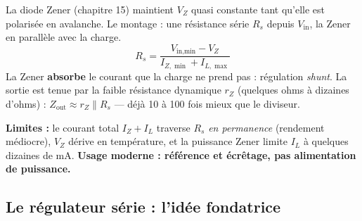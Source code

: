 \documentclass[12pt,a4paper,twoside]{book}
\begin{document}
\begin{formule}
La diode Zener (chapitre 15) maintient $V_Z$ quasi constante tant qu'elle est polarisée en avalanche. Le montage : une résistance série $R_s$ depuis $V_{\text{in}}$, la Zener en parallèle avec la charge.
\[
R_s = \frac{V_{\text{in,min}} - V_Z}{I_{Z,\min} + I_{L,\max}}
\]
La Zener \textbf{absorbe} le courant que la charge ne prend pas : régulation \textit{shunt}. La sortie est tenue par la faible résistance dynamique $r_Z$ (quelques ohms à dizaines d'ohms) : $Z_{\text{out}} \approx r_Z \parallel R_s$ --- déjà 10 à 100 fois mieux que le diviseur.

\textbf{Limites :} le courant total $I_{Z}+I_L$ traverse $R_s$ \textit{en permanence} (rendement médiocre), $V_Z$ dérive en température, et la puissance Zener limite $I_L$ à quelques dizaines de mA. \textbf{Usage moderne : référence et écrêtage, pas alimentation de puissance.}
\end{formule}

\subsection{Le régulateur série : l'idée fondatrice}
\end{document}
